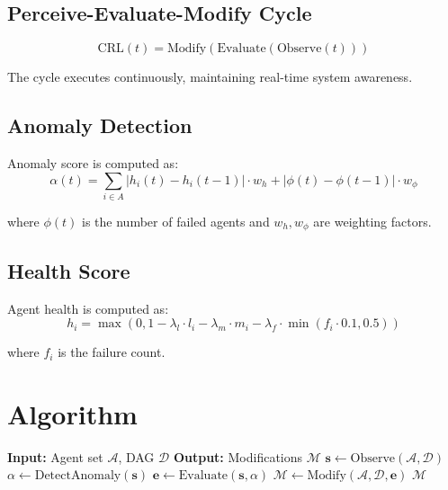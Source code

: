 \documentclass[sigconf]{acmart}
\begin{document}
\subsection{Perceive-Evaluate-Modify Cycle}

\begin{equation}
\text{CRL}(t) = \text{Modify}(\text{Evaluate}(\text{Observe}(t)))
\end{equation}

The cycle executes continuously, maintaining real-time system awareness.

\subsection{Anomaly Detection}

Anomaly score is computed as:
\begin{equation}
\alpha(t) = \sum_{i \in A} |h_i(t) - h_i(t-1)| \cdot w_h + |\phi(t) - \phi(t-1)| \cdot w_\phi
\end{equation}

where $\phi(t)$ is the number of failed agents and $w_h, w_\phi$ are weighting factors.

\subsection{Health Score}

Agent health is computed as:
\begin{equation}
h_i = \max(0, 1 - \lambda_l \cdot l_i - \lambda_m \cdot m_i - \lambda_f \cdot \min(f_i \cdot 0.1, 0.5))
\end{equation}

where $f_i$ is the failure count.

\section{Algorithm}

\begin{algorithm}
\caption{Cognitive Resilience Layer Cycle}
\begin{algorithmic}[1]
\State \textbf{Input:} Agent set $\mathcal{A}$, DAG $\mathcal{D}$
\State \textbf{Output:} Modifications $\mathcal{M}$
\State $\mathbf{s} \leftarrow \text{Observe}(\mathcal{A}, \mathcal{D})$
\State $\alpha \leftarrow \text{DetectAnomaly}(\mathbf{s})$
\State $\mathbf{e} \leftarrow \text{Evaluate}(\mathbf{s}, \alpha)$
  \State $\mathcal{M} \leftarrow \text{Modify}(\mathcal{A}, \mathcal{D}, \mathbf{e})$
\EndIf
\State \Return $\mathcal{M}$
\end{algorithmic}
\end{algorithm}
\end{document}
